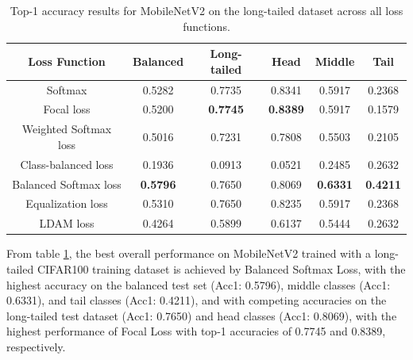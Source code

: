 \begin{table}[H]
    \centering
    \caption{Top-1 accuracy results for MobileNetV2 on the long-tailed dataset across all loss functions.}
    \begin{tabular}{cccccc}
        \toprule
        Loss Function & Balanced & Long-tailed & Head & Middle & Tail \\ 
        \midrule
        Softmax   & 0.5282   & 0.7735 & 0.8341 & 0.5917 & 0.2368 \\
        Focal loss   & 0.5200   & \textbf{0.7745} & \textbf{0.8389} & 0.5917 & 0.1579 \\
        Weighted Softmax loss   & 0.5016   & 0.7231 & 0.7808 & 0.5503 & 0.2105 \\
        Class-balanced loss   & 0.1936   & 0.0913 & 0.0521 & 0.2485 & 0.2632 \\
        Balanced Softmax loss   & \textbf{0.5796}   & 0.7650 & 0.8069 & \textbf{0.6331} & \textbf{0.4211} \\
        Equalization loss   & 0.5310   & 0.7650 & 0.8235 & 0.5917 & 0.2368 \\
        LDAM loss   & 0.4264 & 0.5899 & 0.6137 & 0.5444 & 0.2632 \\
        \bottomrule
    \end{tabular}
    \label{tab:mobilenet_lt_acc1_1}
\end{table}





From table \ref{tab:mobilenet_lt_acc1_1}, the best overall performance on MobileNetV2 trained with a long-tailed CIFAR100 training dataset is achieved by Balanced Softmax Loss, with the highest accuracy on the balanced test set (Acc1: 0.5796), middle classes (Acc1: 0.6331), and tail classes (Acc1: 0.4211), and with competing accuracies on the long-tailed test dataset (Acc1: 0.7650) and head classes (Acc1: 0.8069), with the highest performance of Focal Loss with top-1 accuracies of 0.7745 and 0.8389, respectively.

